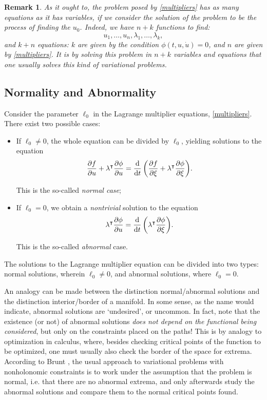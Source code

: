 \documentclass{article}
\theoremstyle{plain}
\theoremstyle{plain}
\newtheorem{remark}{Remark}
\theoremstyle{nonumberplain}
\theoremstyle{empty}
\newcommand{\tr}{\intercal}
\begin{document}
\begin{remark}
As it ought to, the problem posed by \eqref{multipliers} has as many equations as it has variables, if we consider the solution of the problem to be the process of finding the $u_0$. Indeed, we have $n+k$ functions to find:
\[u_1, \dots, u_n, \lambda_1, \dots, \lambda_k,\]
and $k+n$ equations: $k$ are given by the condition $\phi(t,u,\dot u) = 0$, and $n$ are given by \eqref{multipliers}. It is by solving this problem in $n+k$ variables and equations that one usually solves this kind of variational problems.
\end{remark}

\subsection{Normality and Abnormality}

Consider the parameter $\ell_0$ in the Lagrange multiplier equations, \eqref{multipliers}. There exist two possible cases:
\begin{itemize}
\item If $\ell_0 \neq 0$, the whole equation can be divided by $\ell_0$, yielding solutions to the equation
\begin{equation}\label{multipliers:normal}
\diffp f u + \lambda^\tr \diffp \phi u = \diff*{\left(\diffp f \xi + \lambda^\tr \diffp \phi \xi\right)}t.
\end{equation}

This is the so-called \emph{normal case};

\item If $\ell_0 = 0$, we obtain a \emph{nontrivial} solution to the equation
\begin{equation}\label{multipliers:abnormal}
\lambda^\tr \diffp \phi u = \diff*{\left(\lambda^\tr \diffp \phi \xi\right)}t.
\end{equation}

This is the so-called \emph{abnormal} case.
\end{itemize}

The solutions to the Lagrange multiplier equation can be divided into two types: normal solutions, wherein $\ell_0 \neq 0$, and abnormal solutions, where $\ell_0 = 0$.

An analogy can be made between the distinction normal/abnormal solutions and the distinction interior/border of a manifold. In some sense, as the name would indicate, abnormal solutions are `undesired', or uncommon. In fact, note that the existence (or not) of abnormal solutions \emph{does not depend on the functional being considered}, but only on the constraints placed on the paths! This is by analogy to optimization in calculus, where, besides checking critical points of the function to be optimized, one must usually also check the border of the space for extrema. According to Brunt \cite[p.~129]{brunt}, the usual approach to variational problems with nonholonomic constraints is to work under the assumption that the problem is normal, i.e. that there are no abnormal extrema, and only afterwards study the abnormal solutions and compare them to the normal critical points found.
\end{document}
